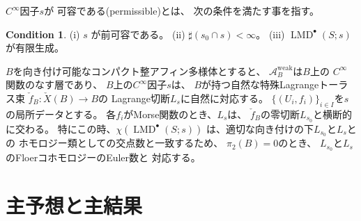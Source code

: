 \documentclass[uplatex,dvipdfmx,12pt]{jsarticle}
\numberwithin{equation}{section}
\theoremstyle{definition}
\newtheorem{condition}[theorem]{Condition}
\newcommand{\opn}[1]{\operatorname{#1}}
\begin{document}
$C^{\infty}$因子$s$が
可容である(permissible)とは、
次の条件を満たす事を指す。

\setcounter{section}{2}
\setcounter{condition}{38}
\begin{condition} \label{condition-good}
(i) $s$ が前可容である。
(ii) $\sharp (s_0\cap s)<\infty$。
(iii) $\opn{LMD}^{\bullet}(S;s)$ が有限生成。
\end{condition}

$B$を向き付け可能なコンパクト整アフィン多様体とすると、
$\mathcal{A}_B^{\mathrm{weak}}$は$B$上の
$C^{\infty}$関数のなす層であり、
$B$上の$C^{\infty}$因子$s$は、
$B$が持つ自然な特殊Lagrangeトーラス束
$\check{f}_B\colon \check{X}(B)\to B$の
Lagrange切断$L_s$に自然に対応する。
$\{(U_i,f_i)\}_{i\in I}$を$s$の局所データとする。
各$f_i$がMorse関数のとき、$L_s$は、
$\check{f}_B$の零切断$L_{s_0}$と横断的に交わる。
特にこの時、$\chi(\opn{LMD}^{\bullet}(S;s))$
は、適切な向き付けの下$L_{s_0}$と$L_{s}$との
ホモロジー類としての交点数と一致するため、
$\pi_2(B)=0$のとき、
$L_{s_0}$と$L_{s}$のFloerコホモロジーのEuler数と
対応する\cite{MR1882331,MR4301560}。

\section{主予想と主結果}
\end{document}
